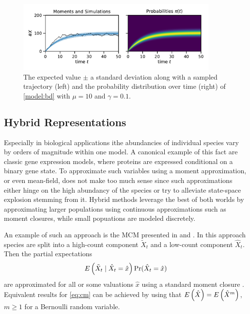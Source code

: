 \begin{figure}[htb]
    \centering
    \includegraphics[width=0.9\textwidth]{gfx/momsandprobs.pdf}
    \caption[Moments and probability distribution $\pi(t)$]{\label{fig:momsandprobs}The expected value $\pm$ a standard deviation along with a sampled trajectory (left) and the probability distribution over time (right) of \autoref{model:bd} with $\mu=10$ and $\gamma=0.1$.}
\end{figure}

\subsection{Hybrid Representations}
Especially in biological applications ithe abundancies of individual species vary by orders
of magnitude within one model.
A canonical example of this fact are classic gene expression models, where proteins are expressed
conditional on a binary gene state.
To approximate such variables using a moment approximation, or even mean-field, does not make too much sense since such approximations either hinge on the high abundancy of the species or try to alleviate state-space explosion stemming from it.
Hybrid methods leverage the best of both worlds by approximating larger populations using continuous approximations such as moment closures, while small popuations are modeled discretely.

An example of such an approach is the \ac{MCM} presented in \citet{hasenauer2014method} and \citet{kazeroonian2014modeling}.
In this approach species are split into a high-count component $\tilde{X}_t$ and a low-count component $\hat{X}_t$.
Then the partial expectations
\begin{equation}\label{eq:cm}
    {E}\left(\tilde{X}_t \mid \hat{X}_t = \hat{x}\right)\Pr({\hat{X}_t=\hat{x}})
\end{equation}
are approximated for all or some valuations $\hat{x}$ using a standard moment closure \parencite{andreychenko2015reconstruction}.
Equivalent results for \eqref{eq:cm} can be achieved by using that ${E}\left(\hat{X}\right)={E}\left(\hat{X}^m\right)$, $m\geq 1$ for a Bernoulli random variable.

